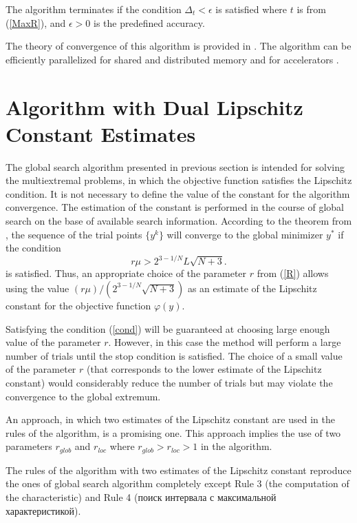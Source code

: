 \documentclass[runningheads]{llncs}
\begin{document}
The algorithm terminates if the condition $\Delta_t < \epsilon$ is satisfied
where $t$ is from (\ref{MaxR}), and $\epsilon>0$ is the predefined accuracy. 

The theory of convergence of this algorithm is provided in \cite{Strongin2000}. 
The algorithm can be efficiently parallelized for shared and distributed memory \cite{Gergel2003}  and for accelerators \cite{Gergel2016}.


\section{Algorithm with Dual Lipschitz Constant Estimates}


The global search algorithm presented in previous section is intended for solving the multiextremal problems, in which the objective function satisfies the Lipschitz condition. It is not necessary to define the value of the constant for the algorithm convergence. The estimation of the constant is performed in the course of global search on the base of available search information. 
According to the theorem from \cite{Strongin2000}, the sequence of the trial points $\{y^k\}$ will converge to the global minimizer $y^*$ if the condition 
\begin{equation}\label{cond}
r\mu > 2^{3-1/N}L\sqrt{N+3}.
\end{equation}
\noindent is satisfied. Thus,  an appropriate choice of the parameter $r$ from (\ref{R}) allows using the value $(r\mu) / (2^{3-1/N}\sqrt{N+3})$ as an estimate of the Lipschitz constant for the objective function $\varphi(y)$.

Satisfying the condition (\ref{cond}) will be guaranteed at choosing large enough value of the parameter $r$. However, in this case the method will perform a large number of trials until the stop condition is satisfied.
The choice of a small value of the parameter $r$ (that corresponds to the lower estimate of the Lipschitz constant) would considerably reduce the number of trials but may violate the convergence to the global extremum.

An approach, in which two estimates of the Lipschitz constant %
are used in the rules of the algorithm, is a promising one. 
This approach implies the use of two parameters $r_{glob}$ and $r_{loc}$ where $r_{glob} > r_{loc}>1$ in the algorithm.

The rules of the algorithm with two estimates of the Lipschitz constant reproduce the ones of global search algorithm completely except Rule 3 (the computation of the characteristic) and Rule 4 (поиск интервала с максимальной характеристикой).
\end{document}
